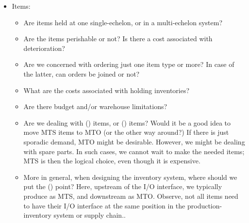 \begin{exercise}
\begin{solution}
\begin{itemize}
\begin{itemize}
      \end{itemize}
    \item Items:
      \begin{itemize}
      \item Are items held at one single-echelon, or in a multi-echelon system?
      \item Are the items perishable or not? Is there a cost associated with deterioration?
      \item Are we concerned with ordering just one item type or more? In case of the latter, can orders be joined or not? 
      \item What are the costs associated with holding inventories?
      \item Are there budget and/or warehouse limitations?
      \item Are we dealing with  () items, or  () items? Would it be a good idea to move MTS items to MTO (or the other way around?) If there is just sporadic demand, MTO might be desirable. However, we might be dealing with spare parts. In such cases, we cannot wait to make the needed items; MTS is then the logical choice, even though it is expensive. 
      \item More in general, when designing the inventory system, where should we put the  () point? Here, upstream of the I/O interface, we typically produce as MTS, and downstream as MTO. Observe, not all items need to have their  I/O interface at the same position in the production-inventory system or supply chain.. 
 \end{itemize}
\end{itemize}
\end{solution}
\end{exercise}

